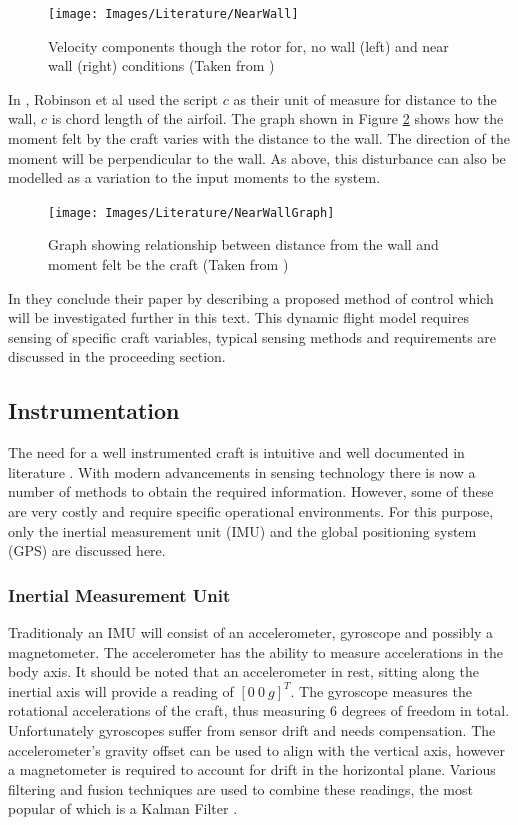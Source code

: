 		\begin{figure}[H]
			\centering
			\texttt{[image: Images/Literature/NearWall]}     
			\caption{Velocity components though the rotor for, no wall (left) and near wall (right) conditions (Taken from \cite{NearWall})}
			\label{IM_NearWall}
		\end{figure}
		
		In \cite{NearWall}, Robinson et al used the script $c$ as their unit of measure for distance to the wall, $c$ is chord length of the airfoil. The graph shown in Figure \ref{IM_NearWallGraph} shows how the moment felt by the craft varies with the distance to the wall. The direction of the moment will be perpendicular to the wall. As above, this disturbance can also be modelled as a variation to the input moments to the system.
		
		\begin{figure}[H]
			\centering
			\texttt{[image: Images/Literature/NearWallGraph]}     
			\caption{Graph showing relationship between distance from the wall and moment felt be the craft (Taken from \cite{NearWall})}
			\label{IM_NearWallGraph}
		\end{figure}
		
		In \cite{NearWall} they conclude their paper by describing a proposed method of control which will be investigated further in this text. This dynamic flight model requires sensing of specific craft variables, typical sensing methods and requirements are discussed in the proceeding section. 
	
	\subsection{Instrumentation}
	The need for a well instrumented craft is intuitive and well documented in literature \cite{Moller2015, Hoffmann}. With modern advancements in sensing technology there is now a number of methods to obtain the required information. However, some of these are very costly and require specific operational environments. For this purpose, only the inertial measurement unit (IMU) and the global positioning system (GPS) are discussed here.
	
		\subsubsection{Inertial Measurement Unit}
		Traditionaly an IMU will consist of an accelerometer, gyroscope and possibly a magnetometer. The accelerometer has the ability to measure accelerations in the body axis. It should be noted that an accelerometer in rest, sitting along the inertial axis will provide a reading of $[0\  0\  g]^T$. The gyroscope measures the rotational accelerations of the craft, thus measuring 6 degrees of freedom in total. Unfortunately gyroscopes suffer from sensor drift and needs compensation. The accelerometer's gravity offset can be used to align with the vertical axis, however a magnetometer is required to account for drift in the horizontal plane. Various filtering and fusion techniques are used to combine these readings, the most popular of which  is a Kalman Filter \cite{Moller2015, Hoffmann}.
		
